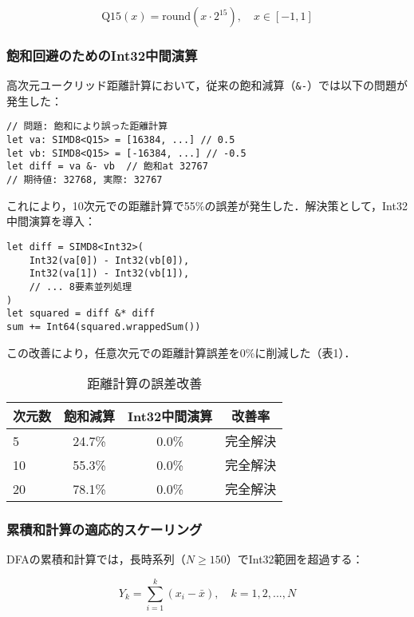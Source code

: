 \documentclass[10pt,twocolumn]{article}
\begin{document}
\begin{CJK}{UTF8}{min}
\begin{equation}
\text{Q15}(x) = \text{round}(x \cdot 2^{15}), \quad x \in [-1, 1]
\end{equation}

\subsubsection{飽和回避のためのInt32中間演算}
高次元ユークリッド距離計算において，従来の飽和減算（\verb|&-|）では以下の問題が発生した：

\begin{lstlisting}[caption=飽和問題の発生例]
// 問題: 飽和により誤った距離計算
let va: SIMD8<Q15> = [16384, ...] // 0.5
let vb: SIMD8<Q15> = [-16384, ...] // -0.5
let diff = va &- vb  // 飽和at 32767
// 期待値: 32768, 実際: 32767
\end{lstlisting}

これにより，10次元での距離計算で55\%の誤差が発生した．解決策として，Int32中間演算を導入：

\begin{lstlisting}[caption=Int32中間演算による解決]
let diff = SIMD8<Int32>(
    Int32(va[0]) - Int32(vb[0]),
    Int32(va[1]) - Int32(vb[1]),
    // ... 8要素並列処理
)
let squared = diff &* diff
sum += Int64(squared.wrappedSum())
\end{lstlisting}

この改善により，任意次元での距離計算誤差を0\%に削減した（表1）．

\begin{table}[t]
\caption{距離計算の誤差改善}
\centering
\begin{tabular}{lccc}
\toprule
次元数 & 飽和減算 & Int32中間演算 & 改善率 \\
\midrule
5 & 24.7\% & 0.0\% & 完全解決 \\
10 & 55.3\% & 0.0\% & 完全解決 \\
20 & 78.1\% & 0.0\% & 完全解決 \\
\bottomrule
\end{tabular}
\end{table}

\subsubsection{累積和計算の適応的スケーリング}
DFAの累積和計算では，長時系列（$N \geq 150$）でInt32範囲を超過する：

\begin{equation}
Y_k = \sum_{i=1}^{k} (x_i - \bar{x}), \quad k = 1, 2, ..., N
\end{equation}


\end{CJK}
\end{document}
